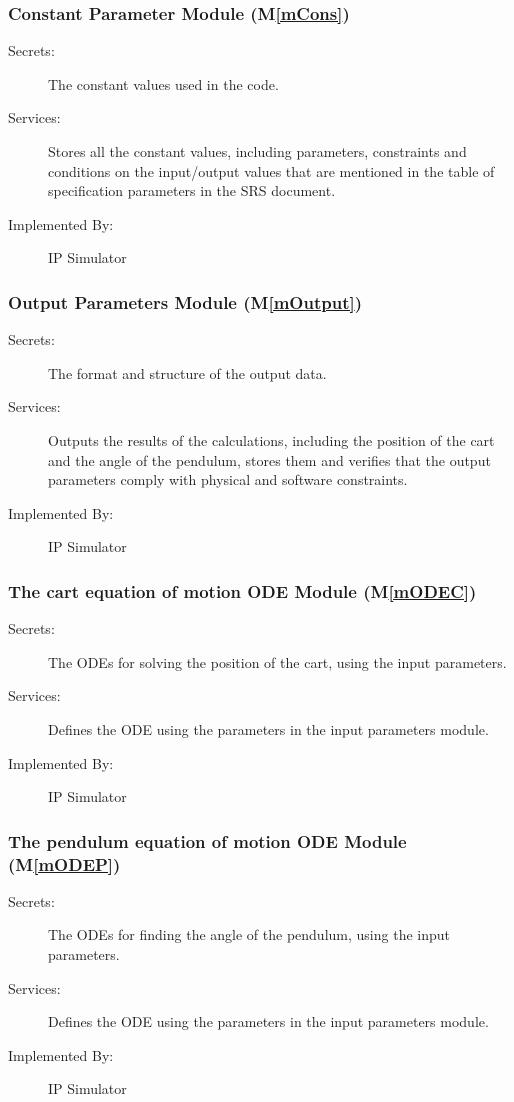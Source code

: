 \documentclass[12pt, titlepage]{article}
\newcommand{\mref}[1]{M\ref{#1}}
\begin{document}
\subsubsection{Constant Parameter Module (\mref{mCons})}
\begin{description}
\item[Secrets:] The constant values used in the code.
\item[Services:] Stores all the constant values, including parameters, constraints and conditions on the input/output values that are mentioned in the table of specification parameters in the SRS document.

\item[Implemented By:] IP Simulator
\end{description} 
\subsubsection{Output Parameters Module (\mref{mOutput})}

\begin{description}
\item[Secrets:] The format and structure of the output data.
\item[Services:] Outputs the results of the calculations, including the position of the cart and the angle of the pendulum, stores them and verifies that the output parameters comply with physical and software constraints.
\item[Implemented By:] IP Simulator
\end{description} 




\subsubsection{The cart equation of motion ODE Module (\mref{mODEC})}

\begin{description}
\item[Secrets:] The ODEs for solving the position of the cart, using the input parameters.
\item[Services:] Defines the ODE using the parameters in the input parameters module.

\item[Implemented By:] IP Simulator
\end{description} 

\subsubsection{The pendulum equation of motion ODE Module (\mref{mODEP})}
\begin{description}
\item[Secrets:] The ODEs for finding the angle of the pendulum, using the input parameters.
\item[Services:] Defines the ODE using the parameters in the input parameters module.

\item[Implemented By:] IP Simulator
\end{description} 
\end{document}

